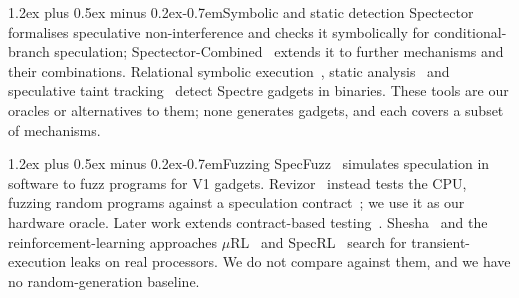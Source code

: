 \documentclass[conference]{IEEEtran}
\makeatletter
\renewcommand\paragraph{\@startsection{paragraph}{4}{\z@}%
  {1.2ex plus 0.5ex minus 0.2ex}{-0.7em}{\normalfont\normalsize\bfseries}}
\makeatother
\begin{document}
\paragraph{Symbolic and static detection} Spectector~\cite{spectector}
formalises speculative non-interference and checks it symbolically for
conditional-branch speculation; Spectector-Combined~\cite{fabian2022} extends it
to further mechanisms and their combinations. Relational symbolic
execution~\cite{daniel2021haunted}, static analysis~\cite{wang2019oo7} and
speculative taint tracking~\cite{qi2021spectaint} detect Spectre gadgets in
binaries. These tools are our oracles or alternatives to them; none generates
gadgets, and each covers a subset of mechanisms.

\paragraph{Fuzzing} SpecFuzz~\cite{oleksenko2020specfuzz} simulates
speculation in software to fuzz programs for V1 gadgets.
Revizor~\cite{revizor} instead tests the CPU, fuzzing random programs against
a speculation contract~\cite{guarnieri2021contracts}; we use it as our hardware
oracle. Later work extends contract-based
testing~\cite{oleksenko2023hideseek,hofmann2023specfault}.
Shesha~\cite{chakraborty2024shesha} and the reinforcement-learning approaches
$\mu$RL~\cite{tol2025murl} and SpecRL~\cite{specrl2025} search for
transient-execution leaks on real processors. We do not compare against them,
and we have no random-generation baseline.
\end{document}
